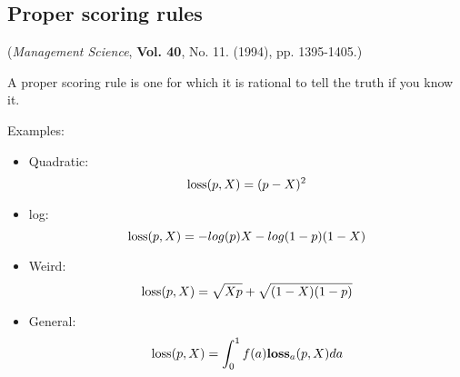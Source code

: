 \documentclass[20pt]{extarticle} %
\begin{document}
\subsection*{Proper scoring rules}

({\em Management Science}, {\bf Vol. 40}, No. 11. (1994), pp. 1395-1405.)

A proper scoring rule is one for which it is rational to tell the
truth if you know it.

Examples:
\begin{itemize}
\item Quadratic:
\begin{displaymath}
\hbox{loss}(p,X) = (p - X)^2
\end{displaymath}
\item log:
\begin{displaymath}
\hbox{loss}(p,X) = -log(p)X - log(1-p)(1-X)
\end{displaymath}
\item Weird:
\begin{displaymath}
\hbox{loss}(p,X) = \sqrt{Xp} + \sqrt{(1-X)(1-p)}
\end{displaymath}
\item General:
\begin{displaymath}
\hbox{loss}(p,X) = \int_0^1 f(a) \hbox{\bf loss}_a(p,X) da
\end{displaymath}
\end{itemize}
\end{document}
